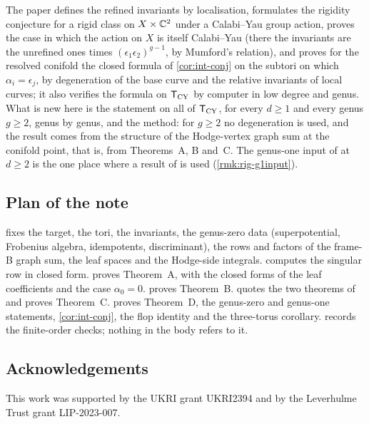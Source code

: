 The paper \cite{BS} defines the refined invariants by localisation, formulates the rigidity conjecture for a rigid class on $X\times\mathbb{C}^2$ under a Calabi--Yau group action, proves the case in which the action on $X$ is itself Calabi--Yau (there the invariants are the unrefined ones times $(\epsilon_1\epsilon_2)^{g-1}$, by Mumford's relation), and proves for the resolved conifold the closed formula of \cref{cor:int-conj} on the subtori on which $\alpha_i=\epsilon_j$, by degeneration of the base curve and the relative invariants of local curves; it also verifies the formula on $\mathsf{T}_{\mathrm{CY}}$ by computer in low degree and genus.  What is new here is the statement on all of $\mathsf{T}_{\mathrm{CY}}$, for every $d\geq1$ and every genus $g\geq2$, genus by genus, and the method: for $g\geq2$ no degeneration is used, and the result comes from the structure of the Hodge-vertex graph sum at the conifold point, that is, from Theorems~A, B and~C. The genus-one input of \cite{BS} at $d\geq2$ is the one place where a result of \cite{BS} is used (\cref{rmk:rig-g1input}).

\subsection{Plan of the note}
\label{sec:int-plan}

 fixes the target, the tori, the invariants, the genus-zero data (superpotential, Frobenius algebra, idempotents, discriminant), the rows and factors of the frame-B graph sum, the leaf spaces and the Hodge-side integrals.  computes the singular row in closed form.  proves Theorem~A, with the closed forms of the leaf coefficients and the case $\alpha_0=0$.  proves Theorem~B.  quotes the two theorems of \cite{LP2} and proves Theorem~C.  proves Theorem~D, the genus-zero and genus-one statements, \cref{cor:int-conj}, the flop identity and the three-torus corollary.  records the finite-order checks; nothing in the body refers to it.


\subsection*{Acknowledgements}

This work was supported by the UKRI grant UKRI2394 and by the Leverhulme Trust grant LIP-2023-007.
